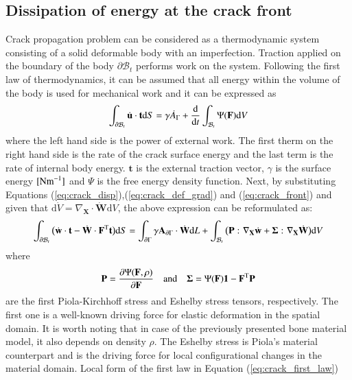 \documentclass[11pt]{acmeArticle}
\numberwithin{equation}{section}
\begin{document}
\subsection{Dissipation of energy at the crack front}
Crack propagation problem can be considered as a thermodynamic system consisting of a solid deformable body with an imperfection. Traction applied on the boundary of the body $\partial \mathcal B_t$ performs work on the system. Following the first law of thermodynamics, it can be assumed that all energy within the volume of the body is used for mechanical work and it can be expressed as 
\begin{equation}
\int_{\partial \mathcal B_t} {\dot {\boldsymbol {\rm u} } } \cdot \mathbf t \mathrm d S = \gamma \dot A_\Gamma +{\frac{\mathrm d}{\mathrm d t }} \int_{\mathcal B_t} \Psi(\mathbf F) \mathrm d V
\end{equation}
where the left hand side is the power of external work. The first therm on the right hand side is the rate of the crack surface energy and the last term is the rate of internal body energy. $\mathbf t$ is the external traction vector, $\gamma $ is the surface energy $[ {\rm{N m}}^{-1} ]$ and $\Psi$ is the free energy density function. Next, by substituting Equations (\ref{eq:crack_disp}),(\ref{eq:crack_def_grad}) and (\ref{eq:crack_front}) and given that $\mathrm d \dot V = \nabla _{\mathbf X} \cdot \mathbf{\dot W} \mathrm d V$, the above expression can be reformulated as:
\begin{equation}\label{eq:crack_first_law}
\int_{\partial \mathcal B_t} \big( {\dot {\boldsymbol {\rm w} } } \cdot \mathbf t - {\dot {\boldsymbol {\rm W} } } \cdot \mathbf F^{\rm T} \mathbf t \big) \mathrm d S = \int_{\partial \Gamma } \gamma \mathbf A_{\partial \Gamma} \cdot {\dot {\boldsymbol {\rm W} } } \mathrm d L + \int_{\mathcal B_t} \big( \mathbf P\, \colon \nabla_{\mathbf X} {\dot {\boldsymbol {\rm w} } } +\mathbf  \Sigma\, \colon \nabla_{\mathbf X} {\dot {\boldsymbol {\rm W} } } \big) \mathrm d V 
\end{equation}
where
\begin{equation}
\mathbf P = \frac{\partial \Psi (\mathbf F, \rho)}{\partial \mathbf F} \quad \mathrm{and } \quad \mathbf \Sigma = \Psi(\mathbf F) \mathbf  1 - \mathbf F^{\rm T} \mathbf P
\end{equation}
are the first Piola-Kirchhoff stress and Eshelby stress tensors, respectively. The first one is a well-known driving force for elastic deformation in the spatial domain. It is worth noting that in case of the previously presented bone material model, it also depends on density $\rho$. The Eshelby stress is Piola's material counterpart and is the driving force for local configurational changes in the material domain. Local form of the first law in Equation (\ref{eq:crack_first_law})
\end{document}
